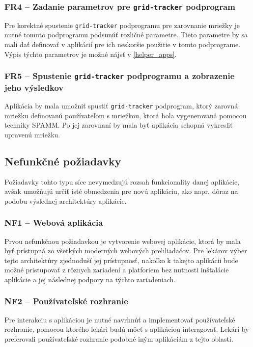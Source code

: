 \subsubsection {FR4 -- Zadanie parametrov pre \texttt{grid-tracker} podprogram}\label{fr4}
Pre korektné spustenie \texttt{grid-tracker} podprogramu pre zarovnanie mriežky je nutné tomuto podprogramu podsunúť rozličné parametre. Tieto parametre by sa mali dať definovať v aplikácií pre ich neskoršie použitie v tomto podprograme. Výpis týchto parametrov je možné nájsť v \ref{helper_apps}.

\subsubsection {FR5 -- Spustenie \texttt{grid-tracker} podprogramu a zobrazenie jeho výsledkov}\label{fr5}
Aplikácia by mala umožniť spustiť \texttt{grid-tracker} podprogram, ktorý zarovná mriežku definovanú používateľom s mriežkou, ktorá bola vygenerovaná pomocou techniky SPAMM. Po jej zarovnaní by mala byť aplikácia schopná vykresliť upravenú mriežku.

\subsection {Nefunkčné požiadavky}
Požiadavky tohto typu síce nevymedzujú rozsah funkcionality danej aplikácie, avšak umožňujú určiť isté obmedzenia pre novú aplikáciu, ako napr. dôraz na podobu výslednej architektúry aplikácie.

\subsubsection {NF1 -- Webová aplikácia}
Prvou nefunkčnou požiadavkou je vytvorenie webovej aplikácie, ktorá by mala byť prístupná zo všetkých moderných webových prehliadačov. Pre lekárov výber tejto architektúry zjednoduší jej prístupnosť, nakoľko k takejto aplikácii bude možné pristupovať z rôznych zariadení a platforiem bez nutnosti inštalácie aplikácie a jej následnej podpory na týchto zariadeniach.

\subsubsection {NF2 -- Používateľské rozhranie}
Pre interakciu s aplikáciou je nutné navrhnúť a implementovať používateľské rozhranie, pomocou ktorého lekári budú môcť s aplikáciou interagovať. Lekári by preferovali používateľské rozhranie podobné iným aplikáciám z tejto oblasti.

